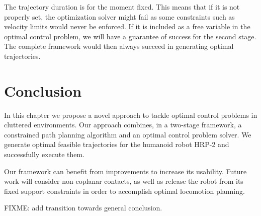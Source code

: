 The trajectory duration is for the moment fixed. This means that if it
is not properly set, the optimization solver might fail as some
constraints such as velocity limits would never be enforced. If it is
included as a free variable in the optimal control problem, we will
have a guarantee of success for the second stage. The complete
framework would then always succeed in generating optimal
trajectories.

\section{Conclusion}
In this chapter we propose a novel approach to tackle optimal control
problems in cluttered environments. Our approach combines, in a
two-stage framework, a constrained path planning algorithm and an
optimal control problem solver. We generate optimal feasible
trajectories for the humanoid robot HRP-2 and successfully execute
them.

Our framework can benefit from improvements to increase its
usability. Future work will consider non-coplanar contacts, as well as
release the robot from its fixed support constraints in order to
accomplish optimal locomotion planning.

FIXME: add transition towards general conclusion.
